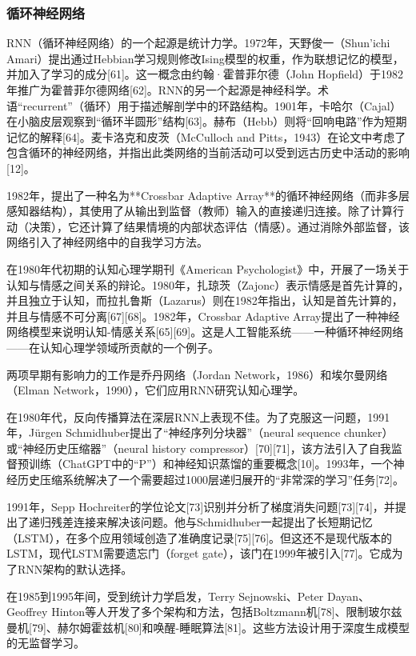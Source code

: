 \subsubsection{循环神经网络}
RNN（循环神经网络）的一个起源是统计力学。1972年，天野俊一（Shun'ichi Amari）提出通过Hebbian学习规则修改Ising模型的权重，作为联想记忆的模型，并加入了学习的成分[61]。这一概念由约翰·霍普菲尔德（John Hopfield）于1982年推广为霍普菲尔德网络[62]。RNN的另一个起源是神经科学。术语“recurrent”（循环）用于描述解剖学中的环路结构。1901年，卡哈尔（Cajal）在小脑皮层观察到“循环半圆形”结构[63]。赫布（Hebb）则将“回响电路”作为短期记忆的解释[64]。麦卡洛克和皮茨（McCulloch and Pitts，1943）在论文中考虑了包含循环的神经网络，并指出此类网络的当前活动可以受到远古历史中活动的影响[12]。

1982年，提出了一种名为**Crossbar Adaptive Array**的循环神经网络（而非多层感知器结构），其使用了从输出到监督（教师）输入的直接递归连接。除了计算行动（决策），它还计算了结果情境的内部状态评估（情感）。通过消除外部监督，该网络引入了神经网络中的自我学习方法。

在1980年代初期的认知心理学期刊《American Psychologist》中，开展了一场关于认知与情感之间关系的辩论。1980年，扎琼茨（Zajonc）表示情感是首先计算的，并且独立于认知，而拉扎鲁斯（Lazarus）则在1982年指出，认知是首先计算的，并且与情感不可分离[67][68]。1982年，Crossbar Adaptive Array提出了一种神经网络模型来说明认知-情感关系[65][69]。这是人工智能系统——一种循环神经网络——在认知心理学领域所贡献的一个例子。

两项早期有影响力的工作是乔丹网络（Jordan Network，1986）和埃尔曼网络（Elman Network，1990），它们应用RNN研究认知心理学。

在1980年代，反向传播算法在深层RNN上表现不佳。为了克服这一问题，1991年，Jürgen Schmidhuber提出了“神经序列分块器”（neural sequence chunker）或“神经历史压缩器”（neural history compressor）[70][71]，该方法引入了自我监督预训练（ChatGPT中的“P”）和神经知识蒸馏的重要概念[10]。1993年，一个神经历史压缩系统解决了一个需要超过1000层递归展开的“非常深的学习”任务[72]。

1991年，Sepp Hochreiter的学位论文[73]识别并分析了梯度消失问题[73][74]，并提出了递归残差连接来解决该问题。他与Schmidhuber一起提出了长短期记忆（LSTM），在多个应用领域创造了准确度记录[75][76]。但这还不是现代版本的LSTM，现代LSTM需要遗忘门（forget gate），该门在1999年被引入[77]。它成为了RNN架构的默认选择。

在1985到1995年间，受到统计力学启发，Terry Sejnowski、Peter Dayan、Geoffrey Hinton等人开发了多个架构和方法，包括Boltzmann机[78]、限制玻尔兹曼机[79]、赫尔姆霍兹机[80]和唤醒-睡眠算法[81]。这些方法设计用于深度生成模型的无监督学习。
